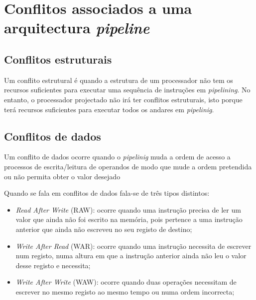 \documentclass[11pt]{article}
\numberwithin{equation}{section}
\begin{document}
\section{Conflitos associados a uma arquitectura \textit{pipeline}}

\subsection{Conflitos estruturais}

Um conflito estrutural é quando a estrutura de um processador não tem os recursos suficientes para executar uma sequência de instruções em \textit{pipelining}. No entanto, o processador projectado não irá ter conflitos estruturais, isto porque terá recursos suficientes para executar todos os andares em \textit{pipelinig}.

\subsection{Conflitos de dados}

Um conflito de dados ocorre quando o \textit{pipelinig} muda a ordem de acesso a processos de escrita/leitura de operandos de modo que mude a ordem pretendida ou não permita obter o valor desejado 

Quando se fala em conflitos de dados fala-se de três tipos distintos:

\vspace{-1.5mm}

\begin{itemize}
	\item \textit{Read After Write} (RAW): ocorre quando uma instrução precisa de ler um valor que ainda não foi escrito na memória, pois pertence a uma instrução anterior que ainda não escreveu no seu registo de destino;
	\vspace{-2.5mm}
	\item \textit{Write After Read} (WAR): ocorre quando uma instrução necessita de escrever num registo, numa altura em que a instrução anterior ainda não leu o valor desse registo e necessita;
	\vspace{-2.5mm}
	\item \textit{Write After Write} (WAW): ocorre quando duas operações necessitam de escrever no mesmo registo ao mesmo tempo ou numa ordem incorrecta;
\end{itemize}

\vspace{-1.5mm}
\end{document}
